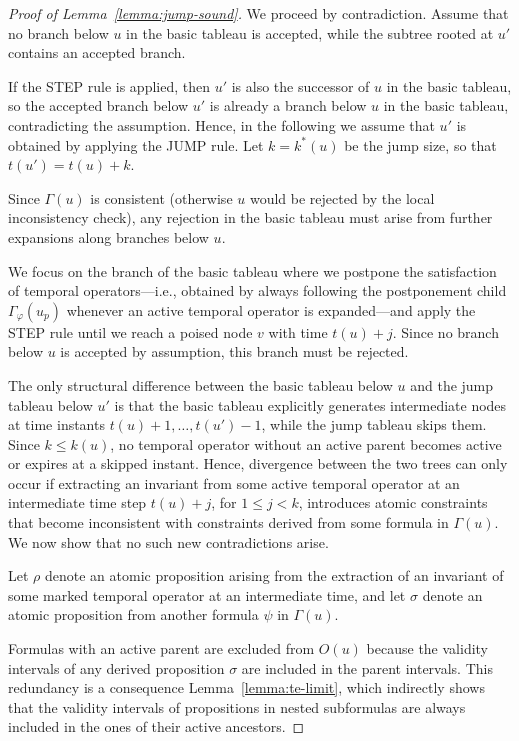 \documentclass{easychair}
\begin{document}
\begin{proof}[Proof of Lemma~\ref{lemma:jump-sound}]
    We proceed by contradiction. Assume that no branch below $u$ in the basic tableau is accepted, while the subtree rooted at $u'$ contains an accepted branch.

    If the \textsf{STEP} rule is applied, then $u'$ is also the successor of $u$ in the basic tableau, so the accepted branch below $u'$ is already a branch below $u$ in the basic tableau, contradicting the assumption. 
    Hence, in the following we assume that $u'$ is obtained by applying the \textsf{JUMP} rule. Let $k = k^{\ast}(u)$ be the jump size, so that $t(u') = t(u) + k$.

    Since $\Gamma(u)$ is consistent (otherwise $u$ would be rejected by the local inconsistency check), any rejection in the basic tableau must arise from further expansions along branches below $u$.

    We focus on the branch of the basic tableau where we postpone the satisfaction of temporal operators---i.e., obtained by always following the postponement child $\Gamma_\varphi(u_p)$ whenever an active temporal operator is expanded---and apply the \textsf{STEP} rule until we reach a poised node $v$ with time $t(u) + j$. 
    Since no branch below $u$ is accepted by assumption, this branch must be rejected.

    The only structural difference between the basic tableau below $u$ and the jump tableau below $u'$ is that the basic tableau explicitly generates intermediate nodes at time instants $t(u) + 1, \dots, t(u') - 1$, while the jump tableau skips them. 
    Since $k \leq k(u)$, no temporal operator without an active parent becomes active or expires at a skipped instant.
    Hence, divergence between the two trees can only occur if extracting an invariant from some active temporal operator at an intermediate time step $t(u) + j$, for $1 \leq j < k$, introduces atomic constraints that become inconsistent with constraints derived from some formula in $\Gamma(u)$.
    We now show that no such new contradictions arise.

    Let $\rho$ denote an atomic proposition arising from the extraction of an invariant of some marked temporal operator at an intermediate time, and let $\sigma$ denote an atomic proposition from another formula $\psi$ in $\Gamma(u)$.

    Formulas with an active parent are excluded from $O(u)$ because the validity intervals of any derived proposition $\sigma$ are included in the parent intervals. 
    This redundancy is a consequence Lemma~\ref{lemma:te-limit}, which indirectly shows that the validity intervals of propositions in nested subformulas are always included in the ones of their active ancestors.


\end{proof}
\end{document}
